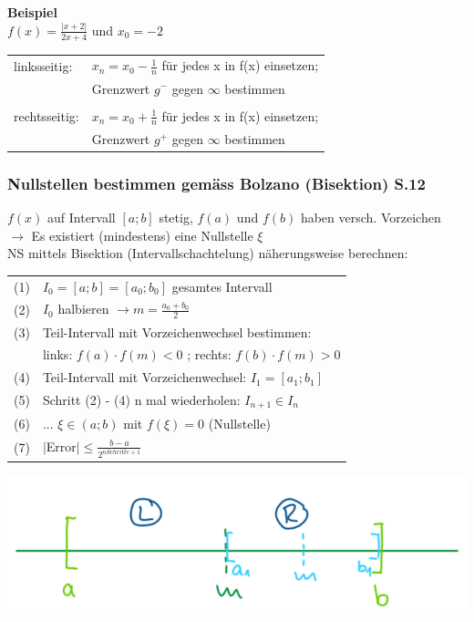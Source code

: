 			\textbf{Beispiel} \\
				$f(x) = \frac{\vert x + 2 \vert}{2x+4}$ und $x_0 = -2$ \\
				\begin{tabular}{ll}
					linksseitig: & $x_n = x_0 - \frac{1}{n}$ für jedes x in f(x) einsetzen; \\
					& Grenzwert $g^-$ gegen $\infty$ bestimmen \\
					\\
					rechtsseitig: & $x_n = x_0 + \frac{1}{n}$ für jedes x in f(x) einsetzen; \\
					& Grenzwert $g^+$ gegen $\infty$ bestimmen \\
				\end{tabular}
			
		\subsubsection{Nullstellen bestimmen gemäss Bolzano (Bisektion) S.12}
			$f(x)$ auf Intervall $[a;b]$ stetig, $f(a)$ und $f(b)$ haben versch. Vorzeichen \\
			$\rightarrow$ Es existiert (mindestens) eine 	Nullstelle $\xi$\\	
			NS mittels Bisektion (Intervallschachtelung) näherungsweise berechnen: \\
			
			\begin{tabular}{ll}
				(1) & $I_0 = [a ; b] = [a_0 ; b_0]$ gesamtes Intervall \\
				(2) & $I_0$ halbieren $\rightarrow m = \frac{a_0 + b_0}{2}$ \\
				(3) & Teil-Intervall mit Vorzeichenwechsel bestimmen: \\
				    & links: $f(a) \cdot f(m) < 0$ ; rechts: $f(b) \cdot f(m) > 0$ \\
				(4) & Teil-Intervall mit Vorzeichenwechsel: $I_1 = [a_1 ; b_1]$ \\
				(5) & Schritt (2) - (4) n mal wiederholen: $I_{n+1} \in I_n$ \\
				(6) & ... $\xi \in (a;b)$ mit $f(\xi) = 0$ (Nullstelle) \\
				(7) & $ \vert $Error$ \vert \leq \frac{b-a}{2^{n Schritte + 1}} $ \\
			\end{tabular}						
				
			\includegraphics[width=0.9\linewidth]{Bilder/bisektion}
		
